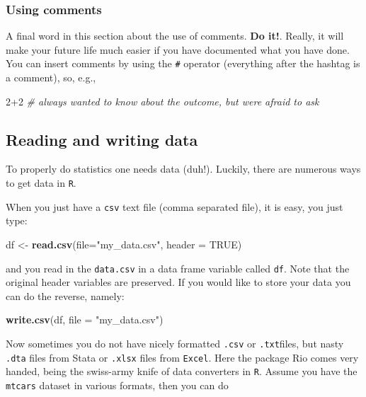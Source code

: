\documentclass[]{article}
\newenvironment{Shaded}{\begin{snugshade}}{\end{snugshade}}
\newcommand{\KeywordTok}[1]{\textcolor[rgb]{0.13,0.29,0.53}{\textbf{{#1}}}}
\newcommand{\DataTypeTok}[1]{\textcolor[rgb]{0.13,0.29,0.53}{{#1}}}
\newcommand{\DecValTok}[1]{\textcolor[rgb]{0.00,0.00,0.81}{{#1}}}
\newcommand{\StringTok}[1]{\textcolor[rgb]{0.31,0.60,0.02}{{#1}}}
\newcommand{\CommentTok}[1]{\textcolor[rgb]{0.56,0.35,0.01}{\textit{{#1}}}}
\newcommand{\OtherTok}[1]{\textcolor[rgb]{0.56,0.35,0.01}{{#1}}}
\newcommand{\NormalTok}[1]{{#1}}
\begin{document}
\subsubsection{Using comments}\label{using-comments}

A final word in this section about the use of comments. \textbf{Do it!}.
Really, it will make your future life much easier if you have documented
what you have done. You can insert comments by using the \texttt{\#}
operator (everything after the hashtag is a comment), so, e.g.,

\begin{Shaded}
\begin{Highlighting}[]
\DecValTok{2+2} \CommentTok{# always wanted to know about the outcome, but were afraid to ask}
\end{Highlighting}
\end{Shaded}

\subsection{Reading and writing data}\label{reading-and-writing-data}

To properly do statistics one needs data (duh!). Luckily, there are
numerous ways to get data in \texttt{R}.

When you just have a \texttt{csv} text file (comma separated file), it
is easy, you just type:

\begin{Shaded}
\begin{Highlighting}[]
\NormalTok{df <-}\StringTok{ }\KeywordTok{read.csv}\NormalTok{(}\DataTypeTok{file=}\StringTok{"my_data.csv"}\NormalTok{, }\DataTypeTok{header =} \OtherTok{TRUE}\NormalTok{)}
\end{Highlighting}
\end{Shaded}

and you read in the \texttt{data.csv} in a data frame variable called
\texttt{df}. Note that the original header variables are preserved. If
you would like to store your data you can do the reverse, namely:

\begin{Shaded}
\begin{Highlighting}[]
\KeywordTok{write.csv}\NormalTok{(df, }\DataTypeTok{file =} \StringTok{"my_data.csv"}\NormalTok{)}
\end{Highlighting}
\end{Shaded}

Now sometimes you do not have nicely formatted \texttt{.csv} or
\texttt{.txt}files, but nasty \texttt{.dta} files from Stata or
\texttt{.xlsx} files from \texttt{Excel}. Here the package Rio comes
very handed, being the swiss-army knife of data converters in
\texttt{R}. Assume you have the \texttt{mtcars} dataset in various
formats, then you can do
\end{document}
